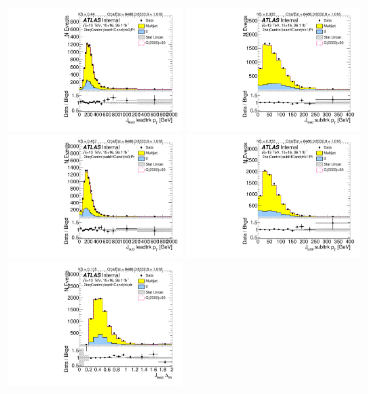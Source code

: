 \begin{figure}[htb!]
\begin{center}
\includegraphics[width=0.41\textwidth,angle=-90]{figures/boosted/Control/b77_TwoTag_split_Control_leadHCand_trk0_Pt.pdf}
\includegraphics[width=0.41\textwidth,angle=-90]{figures/boosted/Control/b77_TwoTag_split_Control_leadHCand_trk1_Pt.pdf}\\
\includegraphics[width=0.41\textwidth,angle=-90]{figures/boosted/Control/b77_TwoTag_split_Control_sublHCand_trk0_Pt.pdf}
\includegraphics[width=0.41\textwidth,angle=-90]{figures/boosted/Control/b77_TwoTag_split_Control_sublHCand_trk1_Pt.pdf}\\
\includegraphics[width=0.41\textwidth,angle=-90]{figures/boosted/Control/b77_TwoTag_split_Control_leadHCand_trk_dr.pdf}

\end{center}
\end{figure}
